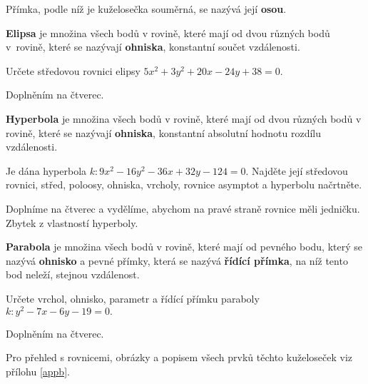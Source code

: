 \begin{definition}
    Přímka, podle níž je kuželosečka souměrná, se nazývá její \textbf{osou}.
\end{definition}

\begin{definition}
\textbf{Elipsa} je množina všech bodů v rovině, které mají od dvou různých bodů v~rovině,
které se nazývají \textbf{ohniska}, konstantní součet vzdálenosti.
\end{definition}

\begin{priklad}
Určete středovou rovnici elipsy $5x^2+3y^2+20x-24y+38=0.$
\end{priklad}

\begin{reseni}
Doplněním na čtverec.
\end{reseni}

\begin{definition}
\textbf{Hyperbola} je množina všech bodů v rovině, které mají od dvou různých
bodů v rovině, které se nazývají \textbf{ohniska}, konstantní absolutní
hodnotu rozdílu vzdálenosti.
\end{definition}

\begin{priklad}
Je dána hyperbola $k:9x^2-16y^2-36x+32y-124=0.$ Najděte její středovou rovnici,
střed, poloosy, ohniska, vrcholy, rovnice asymptot a hyperbolu načrtněte.
\end{priklad}

\begin{reseni}
Doplníme na čtverec a vydělíme, abychom na pravé straně rovnice měli jedničku.
Zbytek z vlastností hyperboly.
\end{reseni}

\begin{definition}
\textbf{Parabola} je množina všech bodů v rovině, které mají od pevného bodu, který
se nazývá \textbf{ohnisko} a pevné přímky, která se nazývá \textbf{řídící přímka},
na níž tento bod neleží, stejnou vzdálenost.
\end{definition}

\begin{priklad}
Určete vrchol, ohnisko, parametr a řídící přímku paraboly $k:y^2-7x-6y-19=0.$
\end{priklad}

\begin{reseni}
Doplněním na čtverec.
\end{reseni}

\begin{pozn}
    Pro přehled s rovnicemi, obrázky a popisem všech prvků těchto kuželoseček
    viz přílohu \ref{appb}.
\end{pozn}

